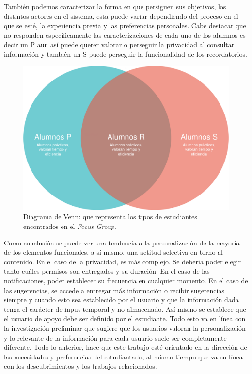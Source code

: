    \par También podemos caracterizar la forma en que persiguen sus objetivos, los distintos actores en el sistema, esta puede variar dependiendo del proceso en el que se esté, la experiencia previa y las preferencias personales. Cabe destacar que no responden específicamente las caracterizaciones de cada uno de los alumnos es decir un \acrshort{P} aun así puede querer valorar o perseguir la privacidad al consultar información y también un \acrshort{S} puede perseguir la funcionalidad de los recordatorios.
    \begin{figure}[h]
        \centering
        \includegraphics[scale=0.2]{media/imagenes/focus_groups/Tipos_de_alumnos-Diagrama_de_Venn.png}
        \caption{Diagrama de Venn: que representa los tipos de estudiantes encontrados en el \textit{Focus Group}.}
        \label{fig:alumnosVenn}
    \end{figure}
    \par Como conclusión se puede ver una tendencia a la personalización de la mayoría de los elementos funcionales, a sí mismo, una actitud selectiva en torno al contenido. En el caso de la privacidad, es más complejo. Se debería poder elegir tanto cuáles permisos son entregados y su duración. En el caso de las notificaciones, poder establecer su frecuencia en cualquier momento. En el caso de las sugerencias, se accede a entregar más información o recibir sugerencias siempre y cuando esto sea establecido por el usuario y que la información dada tenga el carácter de input temporal y no almacenado. Así mismo se establece que el usuario de apoyo debe ser definido por el estudiante. Todo esto va en línea con la investigación preliminar que sugiere que los usuarios valoran la personalización y lo relevante de la información para cada usuario suele ser completamente diferente. Todo lo anterior, hace que este trabajo esté orientado en la dirección de las necesidades y preferencias del estudiantado, al mismo tiempo que va en línea con los descubrimientos y los trabajos relacionados.

